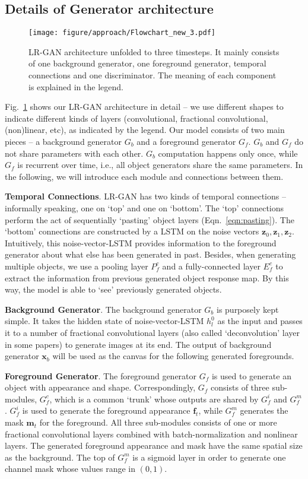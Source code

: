 \documentclass{article} \usepackage{iclr2017_conference,times}
\begin{document}
\subsection{Details of Generator architecture}
\vspace{-5pt}
\begin{figure}[t]
\center
\texttt{[image: figure/approach/Flowchart\_new\_3.pdf]}
\caption{LR-GAN architecture unfolded to three timesteps. It mainly consists of one background generator, one foreground generator, temporal connections and one discriminator. The meaning of each component is explained in the legend.} 
\label{Fig_FlowChart}
\end{figure}

Fig.~\ref{Fig_FlowChart} shows our LR-GAN architecture in detail -- we use different shapes to indicate different kinds of layers (convolutional, fractional convolutional, (non)linear, etc), 
as indicated by the legend. Our model consists of two main pieces -- a background generator $G_b$ and a foreground generator $G_f$. $G_b$ and $G_f$ do not share parameters with each other. $G_b$ computation happens only once, while $G_f$ is recurrent over time, i.e., all object generators share the same parameters. In the following, we will introduce each module and connections between them. 

\textbf{Temporal Connections}.  
LR-GAN has two kinds of temporal connections -- informally speaking, one on `top' and one on `bottom'. The `top' connections perform the act of sequentially `pasting' object layers (Eqn.~\ref{eqn:pasting}). The `bottom' connections are constructed by a LSTM on the noise vectors $\bm{z}_0, \bm{z}_1, \bm{z}_2$. Intuitively, this noise-vector-LSTM provides information to the foreground generator about what else has been generated in past. Besides, when generating multiple objects, we use a pooling layer $P_f^c$ and a fully-connected layer $E_f^c$ to extract the information from previous generated object response map. By this way, the model is able to `see' previously generated objects.

\textbf{Background Generator}. The background generator $G_b$ is purposely kept simple. 
It takes the hidden state of noise-vector-LSTM $h_l^0$ as the input and passes it to a number of fractional convolutional layers (also called `deconvolution' layer in some papers) to generate images at its end. The output of background generator $\bm{x}_b$ will be used as the canvas for the following generated foregrounds.

\textbf{Foreground Generator}. The foreground generator $G_f$ is used to generate an object with appearance and shape. Correspondingly, $G_f$ consists of three sub-modules, $G_f^c$, which is a common `trunk' whose outputs are shared by $G_f^i$ and $G_f^m$. $G_f^i$ is used to generate the foreground appearance $\bm{f}_t$, while $G_f^m$ generates the mask $\bm{m}_t$ for the foreground. All three sub-modules consists of one or more fractional convolutional layers combined with batch-normalization and nonlinear layers. The generated foreground appearance and mask have the same spatial size as the background. The top of $G_f^m$ is a sigmoid layer in order to generate one channel mask whose values range in $(0, 1)$.
\end{document}
